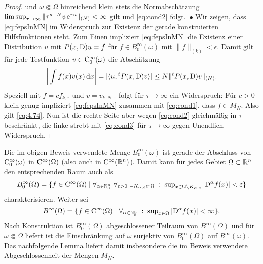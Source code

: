 \begin{proof}
und $\omega\Subset\Omega$ hinreichend klein stets die Normabschätzung $\limsup_{\tau\to\infty} \|\tau^{s-N}\psi \mathrm e^{\tau u}\|_{(N)}<\infty$ gilt und \eqref{eq:cond2} folgt.~$\bullet$  Wir zeigen, dass \eqref{eq:fepsInMN} im Widerspruch zur Existenz der gerade konstruierten Hilfsfunktionen steht. 
Zum Einen impliziert \eqref{eq:fepsInMN} die Existenz einer Distribution $u$ mit $P(x,\mathrm D)u=f$ für $f\in B^\infty_0(\omega)$ mit $\|f\|_{(k)}<\epsilon$. Damit gilt für jede Testfunktion $v\in\mathrm C_0^\infty(\omega)$ die Abschätzung
\begin{equation}\label{eq:4.74}
   \bigg| \int f(x) v(x) \,\mathrm d x\bigg| = |\langle u, {}^t P(x,\mathrm D) v \rangle| \le N \| {}^t P(x,\mathrm D) v\|_{(N)}.
\end{equation}
Speziell mit $f=c f_{k,\tau}$ und $v=v_{k,N,\tau}$ folgt für $\tau\to\infty$ ein Widerspruch: Für $c>0$ klein genug impliziert \eqref{eq:fepsInMN} zusammen mit \eqref{eq:cond1}, dass $f\in M_N$. Also gilt \eqref{eq:4.74}. Nun ist die rechte Seite aber wegen \eqref{eq:cond2} gleichmäßig in $\tau$ beschränkt, die linke strebt mit \eqref{eq:cond3} für $\tau\to\infty$  gegen Unendlich. Widerspruch.
\end{proof}


\begin{rem}
Die im obigen Beweis verwendete Menge $B^\infty_0(\omega)$ ist gerade der Abschluss von $\mathrm C_0^\infty(\omega)$ in $\mathrm C^\infty(\Omega)$
(also auch in $\mathrm C^\infty(\mathbb R^n)$). Damit kann für jedes Gebiet $\Omega\subset\mathbb R^n$ den entsprechenden Raum auch als
\begin{equation}
B_0^\infty(\Omega) =\{f\in \mathrm C^\infty(\Omega) \mid \forall_{\alpha\in\mathbb N_0^n}\;\forall_{\varepsilon >0} \;\exists_{K_{\alpha,\varepsilon}\Subset\Omega} \;:\; \sup\nolimits_{x\in \Omega\setminus K_{\alpha,\varepsilon}}|\mathrm D^\alpha f(x)|<\varepsilon \}
\end{equation}
charakterisieren. Weiter sei 
\begin{equation}
B^\infty(\Omega) = \{ f\in\mathrm C^\infty(\Omega) \mid  \forall_{\alpha\in\mathbb N_0^n} \;:\; \sup\nolimits_{x\in\Omega} |\mathrm D^\alpha f(x)|<\infty \}.
\end{equation}
Nach Konstruktion ist $B^\infty_0(\Omega)$ abgeschlossener Teilraum von $B^\infty(\Omega)$ und für $\omega\Subset\Omega$ liefert ist die Einschränkung auf $\omega$ surjektiv von $B^\infty_0(\Omega)$ auf $B^\infty(\omega)$. Das nachfolgende Lemma liefert damit insbesondere die im Beweis verwendete Abgeschlossenheit der Mengen $M_N$.
\end{rem}


